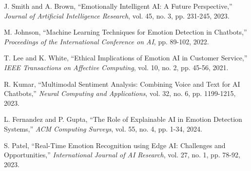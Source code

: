 \documentclass[a4paper,10pt]{article}
\begin{document}
\begin{thebibliography}{9}

J. Smith and A. Brown, ``Emotionally Intelligent AI: A Future Perspective,'' \textit{Journal of Artificial Intelligence Research}, vol. 45, no. 3, pp. 231-245, 2023.

M. Johnson, ``Machine Learning Techniques for Emotion Detection in Chatbots,'' \textit{Proceedings of the International Conference on AI}, pp. 89-102, 2022.

T. Lee and K. White, ``Ethical Implications of Emotion AI in Customer Service,'' \textit{IEEE Transactions on Affective Computing}, vol. 10, no. 2, pp. 45-56, 2021.

R. Kumar, ``Multimodal Sentiment Analysis: Combining Voice and Text for AI Chatbots,'' \textit{Neural Computing and Applications}, vol. 32, no. 6, pp. 1199-1215, 2023.

L. Fernandez and P. Gupta, ``The Role of Explainable AI in Emotion Detection Systems,'' \textit{ACM Computing Surveys}, vol. 55, no. 4, pp. 1-34, 2024.

S. Patel, ``Real-Time Emotion Recognition using Edge AI: Challenges and Opportunities,'' \textit{International Journal of AI Research}, vol. 27, no. 1, pp. 78-92, 2023.

\end{thebibliography}
\end{document}
